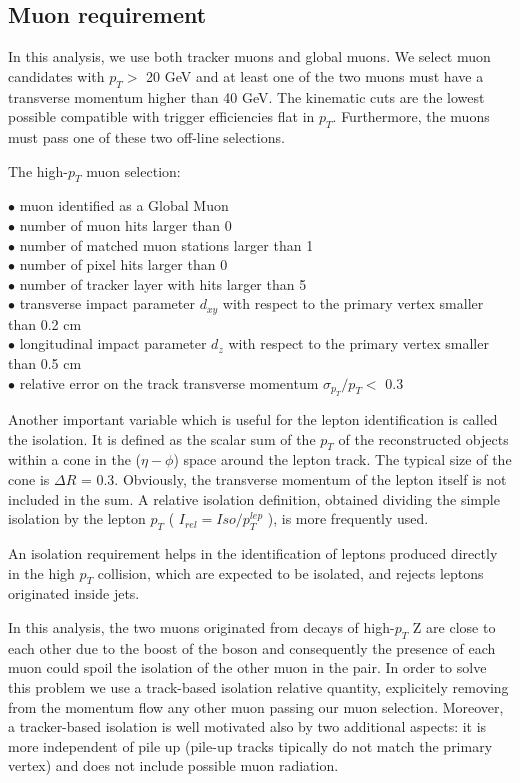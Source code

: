 \documentclass[12pt]{article} %
\begin{document}
\subsection{Muon requirement} %

In this analysis, we use both tracker muons and global muons. We select muon candidates with $p_T>$ 20 GeV and  at least one of the two muons must have a transverse momentum higher than 40 GeV. The kinematic cuts are the lowest possible compatible with trigger efficiencies flat in $p_T$. Furthermore, the muons must pass one of these two off-line selections. 

\noindent
The high-$p_T$ muon selection:

\noindent
$\bullet$ muon identified as a Global Muon \\
$\bullet$ number of muon hits larger than 0 \\
$\bullet$ number of matched muon stations larger than 1 \\
$\bullet$ number of pixel hits larger than 0 \\
$\bullet$ number of tracker layer with hits larger than 5 \\
$\bullet$ transverse impact parameter $d_{xy}$ with respect to the primary vertex smaller than 0.2 cm \\
$\bullet$ longitudinal impact parameter $d_z$ with respect to the primary vertex smaller than 0.5 cm \\
$\bullet$ relative error on the track transverse momentum $\sigma _{p_T} / p_T <$ 0.3

Another important variable which is useful for the lepton identification is called the isolation. It is defined as the scalar sum of the $p_T$ of the reconstructed objects within a cone in the ($\eta - \phi$) space around the lepton track. The typical size of the cone is $\Delta R$ = 0.3. Obviously, the transverse momentum of the lepton itself is not included in the sum. A relative isolation definition, obtained dividing the simple isolation by the lepton $p_T$ ( $I_{rel} = Iso / p^{lep}_T$ ), is more frequently used. 

An isolation requirement helps in the identification of leptons produced directly in the high $p_T$ collision, which are expected to be isolated, and rejects leptons originated inside jets. 

In this analysis, the two muons originated from decays of high-$p_T$ Z are close to each other due to the boost of the boson and consequently the presence of each muon could spoil the isolation of the other muon in the pair. In order to solve this problem we use a track-based isolation relative quantity, explicitely removing from the momentum flow any other muon passing our muon selection. Moreover, a tracker-based isolation is well motivated also by two additional aspects: it is more independent of pile up (pile-up tracks tipically do not match the primary vertex) and does not include possible muon radiation.
\end{document}
